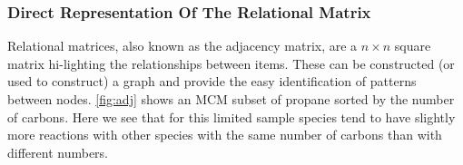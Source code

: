 \subsubsection{Direct Representation Of The Relational Matrix}
Relational matrices, also known as the adjacency matrix, are a $n \times n$ square matrix hi-lighting the relationships between items. These can be constructed (or used to construct) a graph and provide the easy identification of patterns between nodes. \autoref{fig:adj} shows an MCM subset of propane sorted by the number of carbons. Here we see that for this limited sample species tend to have slightly more reactions with other species with the same number of carbons than with different numbers.



